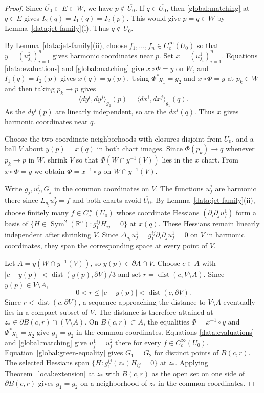 \documentclass[11pt,a4paper]{article}
\theoremstyle{definition}
\theoremstyle{remark}
\numberwithin{equation}{section}
\begin{document}
\begin{proof}
Since $\overline{U_0}\subset E\subset W$, we have $p\notin\overline{U_0}$.
If $q\in\overline{U_0}$, then \eqref{global:matching} at $q\in E$
gives $I_2(q)=I_1(q)=I_2(p)$. This would give $p=q\in W$ by
Lemma~\ref{data:jet-family}(i). Thus $q\notin\overline{U_0}$.

By Lemma~\ref{data:jet-family}(ii), choose $f_1,\ldots,f_n\in
C_c^\infty(U_0)$ so that $y=(u_{f_i}^2)_{i=1}^n$ gives harmonic
coordinates near $p$. Set $x=(u_{f_i}^1)_{i=1}^n$.
Equations \eqref{data:evaluations} and \eqref{global:matching} give
$x\circ\Phi=y$ on $W$, and $I_1(q)=I_2(p)$ gives $x(q)=y(p)$.
Using $\Phi^*g_1=g_2$ and $x\circ\Phi=y$ at $p_k\in W$ and then
taking $p_k\to p$ gives
\[
 \langle dy^i,dy^j\rangle_{g_2}(p)
 =\langle dx^i,dx^j\rangle_{g_1}(q).
\]
As the $dy^i(p)$ are linearly independent, so are the $dx^i(q)$.
Thus $x$ gives harmonic coordinates near $q$.

Choose the two coordinate neighborhoods with closures disjoint from
$\overline{U_0}$, and a ball $V$ about $y(p)=x(q)$ in both chart
images. Since $\Phi(p_k)\to q$ whenever $p_k\to p$ in $W$, shrink
$V$ so that $\Phi(W\cap y^{-1}(V))$ lies in the $x$ chart. From
$x\circ\Phi=y$ we obtain $\Phi=x^{-1}\circ y$ on $W\cap y^{-1}(V)$.

Write $g_j,u_f^j,G_j$ in the common coordinates on $V$. The functions
$u_f^j$ are harmonic there since $L_{g_j}u_f^j=f$ and both charts
avoid $\overline{U_0}$. By Lemma~\ref{data:jet-family}(ii), choose
finitely many $f\in C_c^\infty(U_0)$ whose coordinate Hessians
$(\partial_i\partial_j u_f^1)$ form a basis of
$\{H\in\operatorname{Sym}^2(\mathbb R^n):g_1^{ij}H_{ij}=0\}$
at $x(q)$. These Hessians remain linearly independent after
shrinking $V$. Since $\Delta_{g_1}u_f^1=g_1^{ij}\partial_i\partial_j u_f^1=0$
on $V$ in harmonic coordinates, they span the corresponding space
at every point of $V$.

Let $A=y(W\cap y^{-1}(V))$, so $y(p)\in\partial A\cap V$.
Choose $c\in A$ with $|c-y(p)|<\operatorname{dist}(y(p),\partial V)/3$
and set
$r=\operatorname{dist}(c,V\setminus A)$. Since $y(p)\in V\setminus A$,
\[
 0<r\le |c-y(p)|<\operatorname{dist}(c,\partial V).
\]
Since $r<\operatorname{dist}(c,\partial V)$, a sequence approaching
the distance to $V\setminus A$ eventually lies in a compact subset
of $V$. The distance is therefore attained at
$z_*\in\partial B(c,r)\cap(V\setminus A)$.
On $B(c,r)\subset A$, the equalities $\Phi=x^{-1}\circ y$ and
$\Phi^*g_1=g_2$ give $g_1=g_2$ in the common coordinates.
Equations \eqref{data:evaluations} and \eqref{global:matching} give
$u_f^1=u_f^2$ there for every $f\in C_c^\infty(U_0)$.
Equation~\eqref{global:green-equality} gives $G_1=G_2$ for distinct
points of $B(c,r)$. The selected Hessians span
$\{H:g_1^{ij}(z_*)H_{ij}=0\}$ at $z_*$.
Applying Theorem~\ref{local:extension} at $z_*$ with $B(c,r)$ as
the open set on one side of $\partial B(c,r)$ gives $g_1=g_2$
on a neighborhood of $z_*$ in the common coordinates.


\end{proof}
\end{document}
